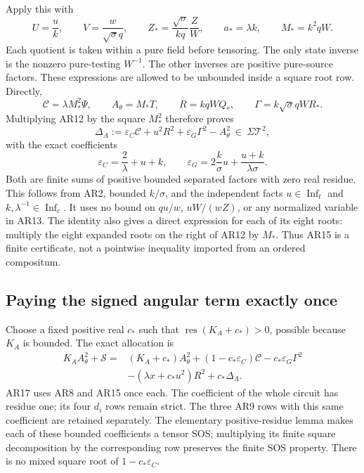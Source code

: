 Apply this with
\[
 U=\frac uk,\qquad V=\frac w{\sqrt\sigma q},\qquad
 Z_* =\frac{\sqrt\sigma}{kq}\frac ZW,
 \qquad a_*=\lambda k,\qquad M_*=k^2qW.
 \tag{AR13}
\]
Each quotient is taken within a pure field before tensoring.
The only state inverse is the nonzero pure-testing $W^{-1}$.
The other inverses are positive pure-source factors. These
expressions are allowed to be unbounded inside a square root row.
Directly,
\[
 \mathscr C=\lambda M_*^2\Psi,\qquad
 A_\theta=M_*T,\qquad R=kqWQ_*,\qquad
 \Gamma=k\sqrt\sigma qWR_*.
 \tag{AR14}
\]
Multiplying AR12 by the square $M_*^2$ therefore proves
\[
\boxed{\quad
 \Delta_A:=\varepsilon_C\mathscr C+u^2R^2
                 +\varepsilon_G\Gamma^2-A_\theta^2
                         \ \in\ \Sigma\mathcal T^2,
 \quad} \tag{AR15}
\]
with the exact coefficients
\[
 \varepsilon_C=\frac2\lambda+u+k,\qquad
 \varepsilon_G=2\frac k\sigma u+
                         \frac{u+k}{\lambda\sigma}.
 \tag{AR16}
\]
Both are finite sums of positive bounded separated factors with
zero real residue. This follows from AR2, bounded $k/\sigma$,
and the independent facts $u\in\operatorname{Inf}_t$ and
$k,\lambda^{-1}\in\operatorname{Inf}_c$. It uses no bound on
$q u/w$, $uW/(wZ)$, or any normalized variable in AR13.
The identity also gives a direct expression for each of its eight
roots: multiply the eight expanded roots on the right of AR12
by $M_*$. Thus AR15 is a finite certificate, not a pointwise
inequality imported from an ordered compositum.

\subsection{Paying the signed angular term exactly once}

Choose a fixed positive real $c_*$ such that
$\operatorname{res}(K_A+c_*)>0$, possible because $K_A$ is
bounded. The exact allocation is
\[
\begin{split}
 K_AA_\theta^2+\mathscr S
  ={}&(K_A+c_*)A_\theta^2
       +(1-c_*\varepsilon_C)\mathscr C
       -c_*\varepsilon_G\Gamma^2\\
    &-(\lambda x+c_*u^2)R^2+c_*\Delta_A.
\end{split} \tag{AR17}
\]
AR17 uses AR8 and AR15 once each. The coefficient of the whole
circuit has residue one; its four $d_i$ rows remain strict.
The three AR9 rows with this same coefficient are retained
separately. The elementary positive-residue lemma makes each
of these bounded coefficients a tensor SOS; multiplying its
finite square decomposition by the corresponding row preserves
the finite SOS property. There is no mixed square root of
$1-c_*\varepsilon_C$.

